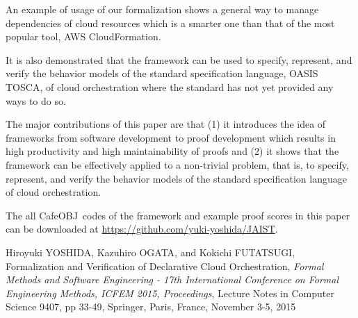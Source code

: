 \documentclass[12pt]{report}
\newcommand{\cafeobj}{{\sf CafeOBJ}~}
\begin{document}
An example of usage of our formalization shows a general way to manage
dependencies of cloud resources which is a smarter one than that of
the most popular tool, AWS CloudFormation.

It is also demonstrated that the framework can be used to specify,
represent, and verify the behavior models of the standard
specification language, OASIS TOSCA, of cloud orchestration where the
standard has not yet provided any ways to do so.

The major contributions of this paper are that (1) it introduces the
idea of frameworks from software development to proof development
which results in high productivity and high maintainability of proofs
and (2) it shows that the framework can be effectively applied to a
non-trivial problem, that is, to specify, represent, and verify the
behavior models of the standard specification language of cloud
orchestration.

The all \cafeobj codes of the framework and example proof scores in this paper
can be downloaded at \url{https://github.com/yuki-yoshida/JAIST}.

\appendix




\begin{publication}

\item
Hiroyuki YOSHIDA, Kazuhiro OGATA, and Kokichi FUTATSUGI,
Formalization and Verification of Declarative Cloud Orchestration,
\emph{Formal Methods and Software Engineering - 17th International Conference
               on Formal Engineering Methods, {ICFEM} 2015, Proceedings}, 
Lecture Notes in Computer Science 9407,
pp 33-49, 
Springer,
Paris, France,
November 3-5, 2015

\end{publication}
\end{document}
